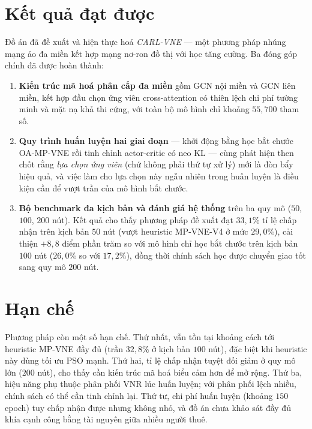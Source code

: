 \documentclass[../DoAn.tex]{subfiles}
\begin{document}
\label{ch:ket_luan}

\section{Kết quả đạt được}              %
\label{sec:ket-qua}

Đồ án đã đề xuất và hiện thực hoá \textit{CARL-VNE} — một phương pháp nhúng mạng ảo đa miền kết hợp mạng nơ-ron đồ thị với học tăng cường. Ba đóng góp chính đã được hoàn thành:

\begin{enumerate}
\item \textbf{Kiến trúc mã hoá phân cấp đa miền} gồm GCN nội miền và GCN liên miền, kết hợp đầu chọn ứng viên cross-attention có thiên lệch chi phí tường minh và mặt nạ khả thi cứng, với toàn bộ mô hình chỉ khoảng $55{,}700$ tham số.
\item \textbf{Quy trình huấn luyện hai giai đoạn} — khởi động bằng học bắt chước OA-MP-VNE rồi tinh chỉnh actor-critic có neo KL — cùng phát hiện then chốt rằng \textit{lựa chọn ứng viên} (chứ không phải thứ tự xử lý) mới là đòn bẩy hiệu quả, và việc làm cho lựa chọn này ngẫu nhiên trong huấn luyện là điều kiện cần để vượt trần của mô hình bắt chước.
\item \textbf{Bộ benchmark đa kịch bản và đánh giá hệ thống} trên ba quy mô ($50$, $100$, $200$ nút). Kết quả cho thấy phương pháp đề xuất đạt $33{,}1\%$ tỉ lệ chấp nhận trên kịch bản $50$ nút (vượt heuristic MP-VNE-V4 ở mức $29{,}0\%$), cải thiện $+8{,}8$ điểm phần trăm so với mô hình chỉ học bắt chước trên kịch bản $100$ nút ($26{,}0\%$ so với $17{,}2\%$), đồng thời chính sách học được chuyển giao tốt sang quy mô $200$ nút.
\end{enumerate}

\section{Hạn chế}                      %
\label{sec:han-che}

Phương pháp còn một số hạn chế. Thứ nhất, vẫn tồn tại khoảng cách tới heuristic MP-VNE đầy đủ (trần $32{,}8\%$ ở kịch bản $100$ nút), đặc biệt khi heuristic này dùng tối ưu PSO mạnh. Thứ hai, tỉ lệ chấp nhận tuyệt đối giảm ở quy mô lớn ($200$ nút), cho thấy cần kiến trúc mã hoá biểu cảm hơn để mở rộng. Thứ ba, hiệu năng phụ thuộc phân phối VNR lúc huấn luyện; với phân phối lệch nhiều, chính sách có thể cần tinh chỉnh lại. Thứ tư, chi phí huấn luyện (khoảng $150$ epoch) tuy chấp nhận được nhưng không nhỏ, và đồ án chưa khảo sát đầy đủ khía cạnh công bằng tài nguyên giữa nhiều người thuê.
\end{document}
